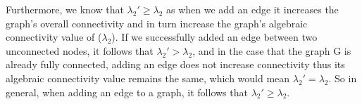\documentclass[12pt,twoside]{article}
\begin{document}
Furthermore, we know that $\lambda_2' \geq \lambda_2$ as when we add an edge it increases the graph's overall connectivity and in turn increase the graph's algebraic connectivity value of ($\lambda_2$). If we successfully added an edge between two unconnected nodes, it follows that $\lambda_2' > \lambda_2$, and in the case that the graph G is already fully connected, adding an edge does not increase connectivity thus its algebraic connectivity value remains the same, which would mean $\lambda_2' = \lambda_2$. So in general, when adding an edge to a graph, it follows that $\lambda_2' \geq \lambda_2$.
\end{document}
